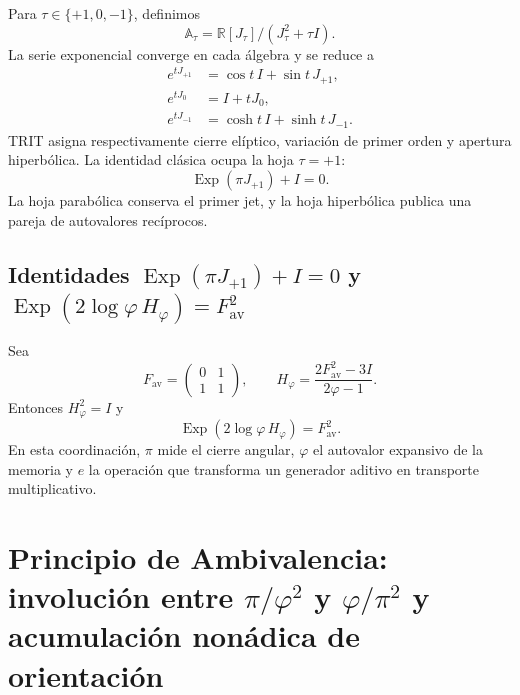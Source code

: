 Para \(\tau\in\{+1,0,-1\}\), definimos
\begin{equation}
 \mathbb A_\tau
 =\mathbb R[J_\tau]/(J_\tau^2+\tau I).
 \label{eq:l9s102:euler-algebras}
\end{equation}
La serie exponencial converge en cada álgebra y se reduce a
\begin{align}
 e^{tJ_{+1}}&=\cos t\,I+\sin t\,J_{+1},
 \label{eq:l9s102:euler-eliptica}\\
 e^{tJ_0}&=I+tJ_0,
 \label{eq:l9s102:euler-parabolica}\\
 e^{tJ_{-1}}&=\cosh t\,I+\sinh t\,J_{-1}.
 \label{eq:l9s102:euler-hiperbolica}
\end{align}
TRIT asigna respectivamente cierre elíptico, variación de primer orden y
apertura hiperbólica. La identidad clásica ocupa la hoja \(\tau=+1\):
\begin{equation}
 \boxed{\operatorname{Exp}(\pi J_{+1})+I=0.}
 \label{eq:l9s102:euler-clasica}
\end{equation}
La hoja parabólica conserva el primer jet, y la hoja hiperbólica publica
una pareja de autovalores recíprocos.

\subsection{Identidades \texorpdfstring{\(\operatorname{Exp}(\pi J_{+1})+I=0\)}{Exp(pi J+1)+I=0} y \texorpdfstring{\(\operatorname{Exp}(2\log\varphi\,H_\varphi)=F_{\mathrm{av}}^2\)}{Exp(2 log phi H_phi)=F_av^2}}

Sea
\begin{equation}
 F_{\mathrm{av}}=\begin{pmatrix}0&1\\1&1\end{pmatrix},
 \qquad
 H_\varphi=\frac{2F_{\mathrm{av}}^2-3I}{2\varphi-1}.
 \label{eq:l9s102:euler-hphi}
\end{equation}
Entonces \(H_\varphi^2=I\) y
\begin{equation}
 \boxed{
 \operatorname{Exp}(2\log\varphi\,H_\varphi)=F_{\mathrm{av}}^2.}
 \label{eq:l9s102:euler-fav}
\end{equation}
En esta coordinación, \(\pi\) mide el cierre angular, \(\varphi\) el
autovalor expansivo de la memoria y \(e\) la operación que transforma un
generador aditivo en transporte multiplicativo.

\section{Principio de Ambivalencia: involución entre \texorpdfstring{\(\pi/\varphi^2\)}{pi/phi^2} y \texorpdfstring{\(\varphi/\pi^2\)}{phi/pi^2} y acumulación nonádica de orientación}
\label{sec:l9s102:euler-ambivalencia}

